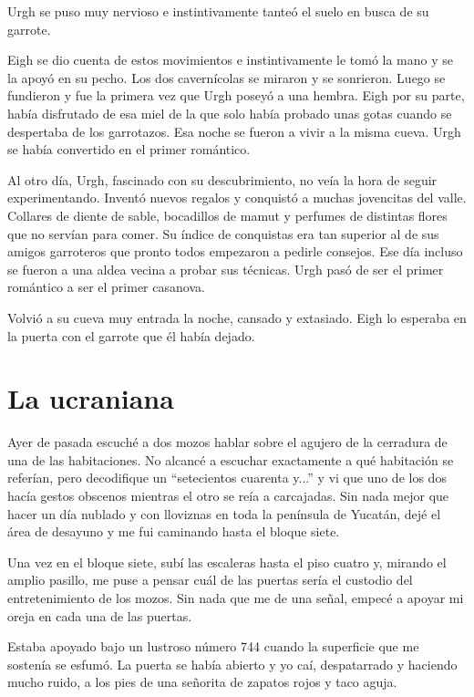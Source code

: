 \documentclass[11pt,twoside,openright,a6paper]{book}
\begin{document}
Urgh se puso muy nervioso e instintivamente tanteó el suelo en busca de su garrote.

Eigh se dio cuenta de estos movimientos e instintivamente le tomó la mano y se la apoyó en su pecho. Los dos cavernícolas se miraron y se sonrieron. Luego se fundieron y fue la primera vez que Urgh poseyó a una hembra. Eigh por su parte, había disfrutado de esa miel de la que solo había probado unas gotas cuando se despertaba de los garrotazos. Esa noche se fueron a vivir a la misma cueva. Urgh se había convertido en el primer romántico.

Al otro día, Urgh, fascinado con su descubrimiento, no veía la hora de seguir experimentando. Inventó nuevos regalos y conquistó a muchas jovencitas del valle. Collares de diente de sable, bocadillos de mamut y perfumes de distintas flores que no servían para comer. Su índice de conquistas era tan superior al de sus amigos garroteros que pronto todos empezaron a pedirle consejos. Ese día incluso se fueron a una aldea vecina a probar sus técnicas. Urgh pasó de ser el primer romántico a ser el primer casanova. 

Volvió a su cueva muy entrada la noche, cansado y extasiado. Eigh lo esperaba en la puerta con el garrote que él había dejado.

\chapter*{La ucraniana}


Ayer de pasada escuché a dos mozos hablar sobre el agujero de la cerradura de
una de las habitaciones. No alcancé a escuchar exactamente a qué habitación
se referían, pero decodifique un “setecientos cuarenta y...” y vi que uno
de los dos hacía gestos obscenos mientras el otro se reía a carcajadas. Sin
nada mejor que hacer un día nublado y con lloviznas en toda la península de
Yucatán, dejé el área de desayuno y me fui caminando hasta el bloque siete.

Una vez en el bloque siete, subí las escaleras hasta el piso cuatro y,
mirando el amplio pasillo, me puse a pensar cuál de las puertas sería el
custodio del entretenimiento de los mozos. Sin nada que me de una señal,
empecé a apoyar mi oreja en cada una de las puertas.

Estaba apoyado bajo un lustroso número 744 cuando la superficie que me
sostenía se esfumó. La puerta se había abierto y yo caí, despatarrado
y haciendo mucho ruido, a los pies de una señorita de zapatos rojos y
taco aguja.
\end{document}
